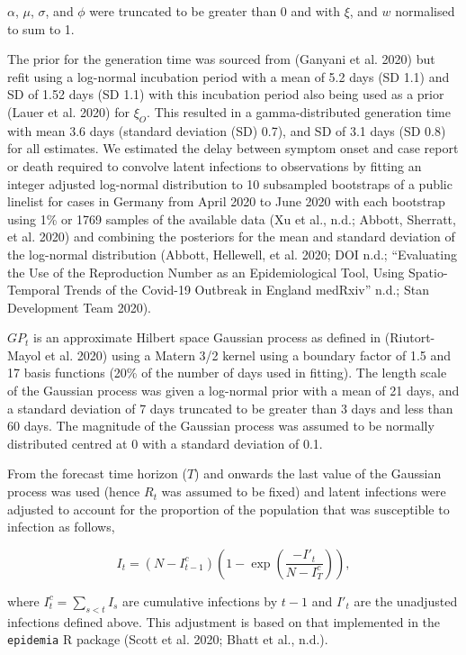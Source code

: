 \documentclass[
]{article}
\begin{document}
\(\alpha\), \(\mu\), \(\sigma\), and \(\phi\) were truncated to be greater than 0 and with \(\xi\), and \(w\) normalised to sum to 1.

The prior for the generation time was sourced from (Ganyani et al. 2020) but refit using a log-normal incubation period with a mean of 5.2 days (SD 1.1) and SD of 1.52 days (SD 1.1) with this incubation period also being used as a prior (Lauer et al. 2020) for \(\xi_{O}\). This resulted in a gamma-distributed generation time with mean 3.6 days (standard deviation (SD) 0.7), and SD of 3.1 days (SD 0.8) for all estimates. We estimated the delay between symptom onset and case report or death required to convolve latent infections to observations by fitting an integer adjusted log-normal distribution to 10 subsampled bootstraps of a public linelist for cases in Germany from April 2020 to June 2020 with each bootstrap using 1\% or 1769 samples of the available data (Xu et al., n.d.; Abbott, Sherratt, et al. 2020) and combining the posteriors for the mean and standard deviation of the log-normal distribution (Abbott, Hellewell, et al. 2020; DOI n.d.; {``Evaluating the Use of the Reproduction Number as an Epidemiological Tool, Using Spatio-Temporal Trends of the {Covid}-19 Outbreak in {England} \textbar{} {medRxiv}''} n.d.; Stan Development Team 2020).

\(GP_t\) is an approximate Hilbert space Gaussian process as defined in (Riutort-Mayol et al. 2020) using a Matern 3/2 kernel using a boundary factor of 1.5 and 17 basis functions (20\% of the number of days used in fitting). The length scale of the Gaussian process was given a log-normal prior with a mean of 21 days, and a standard deviation of 7 days truncated to be greater than 3 days and less than 60 days. The magnitude of the Gaussian process was assumed to be normally distributed centred at 0 with a standard deviation of 0.1.

From the forecast time horizon (\(T\)) and onwards the last value of the Gaussian process was used (hence \(R_t\) was assumed to be fixed) and latent infections were adjusted to account for the proportion of the population that was susceptible to infection as follows,

\begin{equation}
    I_t = (N - I^c_{t-1}) \left(1 - \exp \left(\frac{-I'_t}{N - I^c_{T}}\right)\right),
\end{equation}

where \(I^c_t = \sum_{s< t} I_s\) are cumulative infections by \(t-1\) and \(I'_t\) are the unadjusted infections defined above. This adjustment is based on that implemented in the \texttt{epidemia} R package (Scott et al. 2020; Bhatt et al., n.d.).
\end{document}
